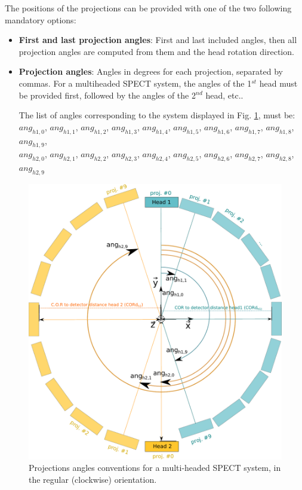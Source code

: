 \documentclass[a4paper, 11pt]{article}
\begin{document}
The positions of the projections can be provided with one of the two following mandatory options:

\begin{itemize}
  \item \textbf{First and last projection angles}: First and last included angles, then all projection angles are computed from them and the head rotation direction.
  \item \textbf{Projection angles}: Angles in degrees for each projection, separated by commas. For a multiheaded SPECT system, the angles of the 1$^{st}$ head must be provided first, followed by the angles of the 2$^{nd}$ head, etc..
  
The list of angles corresponding to the system displayed in Fig. \ref{fig_SPECT_angles}, must be:\\
$ang_{h1,0}$, $ang_{h1,1}$, $ang_{h1,2}$, $ang_{h1,3}$, $ang_{h1,4}$, $ang_{h1,5}$, $ang_{h1,6}$, $ang_{h1,7}$, $ang_{h1,8}$, $ang_{h1,9}$,\\$ang_{h2,0}$, $ang_{h2,1}$, $ang_{h2,2}$, $ang_{h2,3}$, $ang_{h2,4}$, $ang_{h2,5}$, $ang_{h2,6}$, $ang_{h2,7}$, $ang_{h2,8}$, $ang_{h2,9}$
\end{itemize}

\begin{figure} [h]
  \centering
  \includegraphics[width=0.4\columnwidth]{./figures/spect_angles.pdf}
  \caption{Projections angles conventions for a multi-headed SPECT system, in the regular (clockwise) orientation.}
  \label{fig_SPECT_angles}
\end{figure}
\end{document}
